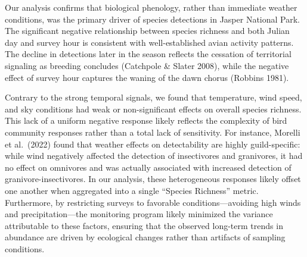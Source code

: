 \documentclass[
  letterpaper,
  DIV=11,
  numbers=noendperiod]{scrartcl}
\begin{document}
Our analysis confirms that biological phenology, rather than immediate
weather conditions, was the primary driver of species detections in
Jasper National Park. The significant negative relationship between
species richness and both Julian day and survey hour is consistent with
well-established avian activity patterns. The decline in detections
later in the season reflects the cessation of territorial signaling as
breeding concludes (Catchpole \& Slater 2008), while the negative effect
of survey hour captures the waning of the dawn chorus (Robbins 1981).

Contrary to the strong temporal signals, we found that temperature, wind
speed, and sky conditions had weak or non-significant effects on overall
species richness. This lack of a uniform negative response likely
reflects the complexity of bird community responses rather than a total
lack of sensitivity. For instance, Morelli et al.~(2022) found that
weather effects on detectability are highly guild-specific: while wind
negatively affected the detection of insectivores and granivores, it had
no effect on omnivores and was actually associated with increased
detection of granivore-insectivores. In our analysis, these
heterogeneous responses likely offset one another when aggregated into a
single ``Species Richness'' metric. Furthermore, by restricting surveys
to favorable conditions---avoiding high winds and precipitation---the
monitoring program likely minimized the variance attributable to these
factors, ensuring that the observed long-term trends in abundance are
driven by ecological changes rather than artifacts of sampling
conditions.
\end{document}
